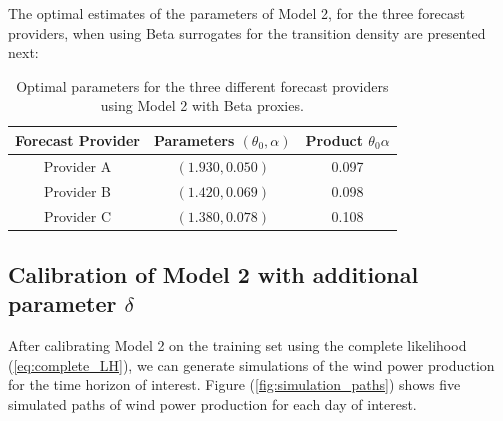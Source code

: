 \documentclass[11pt]{article}
\theoremstyle{definition}
\begin{document}
The optimal estimates of the parameters of Model 2, for the three forecast providers, when using Beta surrogates for the transition density are presented next:
\begin{table}[H]
\centering
\begin{tabular}{ccc}
\toprule
Forecast Provider & Parameters $(\theta_0, \alpha)$ & Product $\theta_0\alpha$ \\ \midrule
Provider A  & $(1.930,0.050)$  &  0.097 \\
Provider B  & $(1.420,0.069) $  &  0.098 \\ 
Provider C  & $(1.380,0.078) $  &  0.108 \\ 
\bottomrule
\end{tabular}
\caption{Optimal parameters for the three different forecast providers using Model 2 with Beta proxies.}
\label{tab:forcast_comparison}
\end{table}


\subsection{Calibration of Model 2 with additional parameter $\delta$}

After calibrating Model 2 on the training set using the complete likelihood (\ref{eq:complete_LH}), we can generate simulations of the wind power production for the time horizon of interest. Figure (\ref{fig:simulation_paths}) shows five simulated paths of wind power production for each day of interest.
\end{document}
